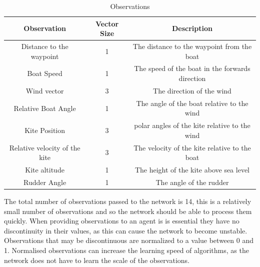 \begin{table}[h]
    \centering
    \begin{tabular}{c|c|c}
        Observation & Vector Size & Description \\
        \midrule
        Distance to the waypoint & 1 & The distance to the waypoint from the boat \\
        Boat Speed & 1 & The speed of the boat in the forwards direction \\
        Wind vector & 3 & The direction of the wind \\
        Relative Boat Angle & 1 & The angle of the boat relative to the wind \\
        Kite Position & 3 & polar angles of the kite relative to the wind\\
        Relative velocity of the kite & 3 & The velocity of the kite relative to the boat \\
        Kite altitude & 1 & The height of the kite above sea level \\
        Rudder Angle & 1 & The angle of the rudder \\

        \hline
    \end{tabular}
    \caption{Observations}\label{observations}
\end{table}

The total number of observations passed to the network is 14, this is a relatively small number of observations and so the network should be able to process them quickly. When providing observations to an agent is is essential they have no discontinuity in their values, as this can cause the network to become unstable. Observations that may be discontinuous are normalized to a value between 0 and 1. Normalised observations can increase the learning speed of algorithms, as the network does not have to learn the scale of the observations.

